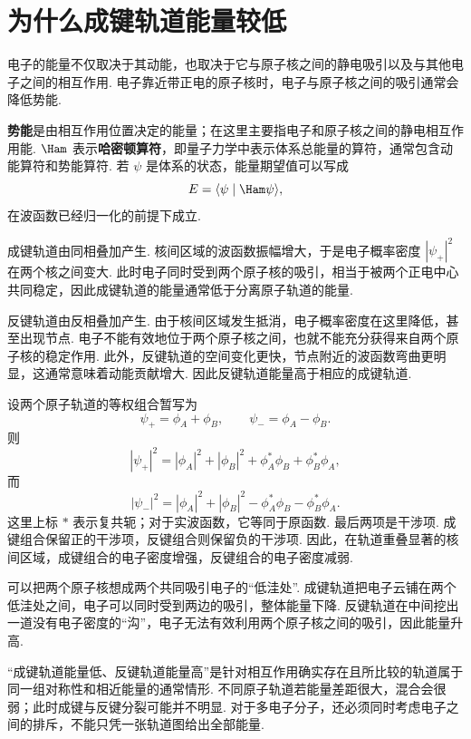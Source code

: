 \documentclass[UTF8,11pt,a4paper,openany]{ctexbook}
\newcommand{\braket}[2]{\langle #1\mid #2\rangle}\newcommand{\ii}{\mathrm i}
\newcommand{\term}[1]{\textbf{#1}}
\begin{document}
\section{为什么成键轨道能量较低}

电子的能量不仅取决于其动能，也取决于它与原子核之间的静电吸引以及与其他电子之间的相互作用. 电子靠近带正电的原子核时，电子与原子核之间的吸引通常会降低势能. 

\begin{notationbox}
\term{势能}是由相互作用位置决定的能量；在这里主要指电子和原子核之间的静电相互作用能. $\Ham$ 表示\term{哈密顿算符}，即量子力学中表示体系总能量的算符，通常包含动能算符和势能算符. 若 $\psi$ 是体系的状态，能量期望值可以写成
\[
E=\braket{\psi}{\Ham\psi},
\]
在波函数已经归一化的前提下成立. 
\end{notationbox}

成键轨道由同相叠加产生. 核间区域的波函数振幅增大，于是电子概率密度 $|\psi_+|^2$ 在两个核之间变大. 此时电子同时受到两个原子核的吸引，相当于被两个正电中心共同稳定，因此成键轨道的能量通常低于分离原子轨道的能量. 

反键轨道由反相叠加产生. 由于核间区域发生抵消，电子概率密度在这里降低，甚至出现节点. 电子不能有效地位于两个原子核之间，也就不能充分获得来自两个原子核的稳定作用. 此外，反键轨道的空间变化更快，节点附近的波函数弯曲更明显，这通常意味着动能贡献增大. 因此反键轨道能量高于相应的成键轨道. 

\begin{derivationbox}
设两个原子轨道的等权组合暂写为
\[
\psi_+=\phi_A+\phi_B,
\qquad
\psi_-=\phi_A-\phi_B.
\]
则
\[
|\psi_+|^2
=|\phi_A|^2+|\phi_B|^2
+\phi_A^*\phi_B+\phi_B^*\phi_A,
\]
而
\[
|\psi_-|^2
=|\phi_A|^2+|\phi_B|^2
-\phi_A^*\phi_B-\phi_B^*\phi_A.
\]
这里上标 $*$ 表示复共轭；对于实波函数，它等同于原函数. 最后两项是干涉项. 成键组合保留正的干涉项，反键组合则保留负的干涉项. 因此，在轨道重叠显著的核间区域，成键组合的电子密度增强，反键组合的电子密度减弱. 
\end{derivationbox}

\begin{analogybox}
可以把两个原子核想成两个共同吸引电子的“低洼处”. 成键轨道把电子云铺在两个低洼处之间，电子可以同时受到两边的吸引，整体能量下降. 反键轨道在中间挖出一道没有电子密度的“沟”，电子无法有效利用两个原子核之间的吸引，因此能量升高. 
\end{analogybox}

\begin{limitbox}
“成键轨道能量低、反键轨道能量高”是针对相互作用确实存在且所比较的轨道属于同一组对称性和相近能量的通常情形. 不同原子轨道若能量差距很大，混合会很弱；此时成键与反键分裂可能并不明显. 对于多电子分子，还必须同时考虑电子之间的排斥，不能只凭一张轨道图给出全部能量. 
\end{limitbox}
\end{document}
